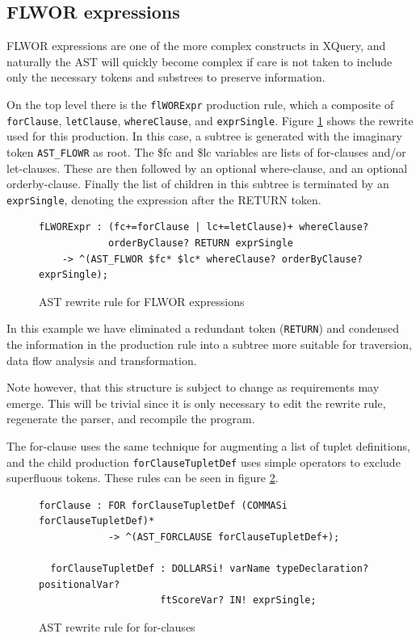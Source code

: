 \subsection{FLWOR expressions}
FLWOR expressions are one of the more complex constructs in XQuery, and
naturally the AST will quickly become complex if care is not taken to include
only the necessary tokens and substrees to preserve information.

On the top level there is the \verb!flWORExpr! production rule, which a
composite of \verb!forClause!, \verb!letClause!, \verb!whereClause!, and
\verb!exprSingle!. Figure \ref{code:ast:flwor} shows the rewrite used for this
production. In this case, a subtree is generated with the imaginary token
\verb!AST_FLOWR! as root. The \$fc and \$lc variables are lists of
for-clauses and/or let-clauses. These are then followed by an optional
where-clause, and an optional orderby-clause. Finally the list of children in
this subtree is terminated by an \verb!exprSingle!, denoting the expression
after the RETURN token.

\begin{figure}[h]
\begin{verbatim}
fLWORExpr : (fc+=forClause | lc+=letClause)+ whereClause?
            orderByClause? RETURN exprSingle
    -> ^(AST_FLWOR $fc* $lc* whereClause? orderByClause? exprSingle);
\end{verbatim}
\caption{AST rewrite rule for FLWOR expressions}
\label{code:ast:flwor}
\end{figure}

In this example we have eliminated a redundant token (\verb!RETURN!) and
condensed the information in the production rule into a subtree more suitable
for traversion, data flow analysis and transformation.

Note however, that this structure is subject to change as requirements may 
emerge. This will be trivial since it is only necessary to edit the rewrite
rule, regenerate the parser, and recompile the program.

The for-clause uses the same technique for augmenting a list of tuplet
definitions, and the child production \verb!forClauseTupletDef! uses simple
operators to exclude superfluous tokens. These rules can be seen in figure
\ref{code:ast:forclause}. 

\begin{figure}[h]
\begin{verbatim} 
forClause : FOR forClauseTupletDef (COMMASi forClauseTupletDef)* 
            -> ^(AST_FORCLAUSE forClauseTupletDef+);

  forClauseTupletDef : DOLLARSi! varName typeDeclaration? positionalVar? 
                     ftScoreVar? IN! exprSingle;
\end{verbatim}
\caption{AST rewrite rule for for-clauses}
\label{code:ast:forclause}
\end{figure}

